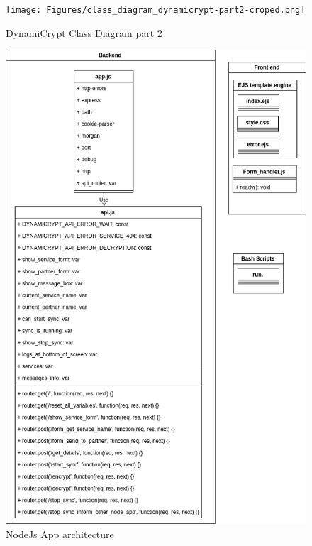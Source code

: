 \begin{figure}[!h]
  \centering
      \texttt{[image: Figures/class\_diagram\_dynamicrypt-part2-croped.png]}
  \caption[DynamiCrypt Class Diagram part 2]{DynamiCrypt Class Diagram part 2}
  \label{fig:class_diagram_dynamicrypt-part2}
\end{figure}
\FloatBarrier

\begin{figure}[!h]
  \centering
      \includegraphics[width=1\textwidth]{Figures/nodeJsApp.png}
  \caption[NodeJs App architecture]{NodeJs App architecture}
  \label{fig:nodeJsApp_architecture}
\end{figure}
\FloatBarrier